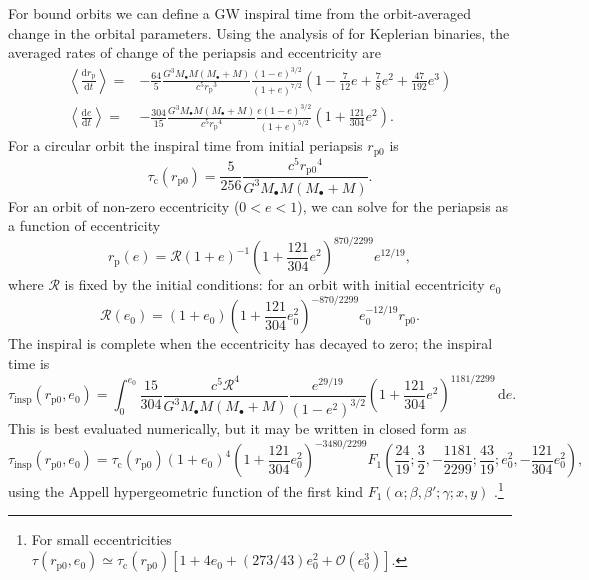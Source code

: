 \documentclass[useAMS,usedcolumn,usegraphicx,usenatbib]{mn2e}
\newcommand{\sub}[1]{\ensuremath{_\mathrm{#1}}}
\newcommand{\dd}{\ensuremath{\mathrm{d}}}
\newcommand{\diff}[2]{\ensuremath{\frac{\dd {#1}}{\dd {#2}}}}
\newcommand{\intd}[4]{\ensuremath{\displaystyle \int_{#1}^{#2}{#3}\,\dd{#4}}}
\newcommand{\order}[1]{\ensuremath{\mathcal{O}({#1})}}
\begin{document}
\begin{onecolumn}
For bound orbits we can define a GW inspiral time from the orbit-averaged change in the orbital parameters. Using the analysis of \citet{Peters1964} for Keplerian binaries, the averaged rates of change of the periapsis and eccentricity are
\begin{align}
\left\langle\diff{r\sub{p}}{t}\right\rangle = {} & -\frac{64}{5}\frac{G^3M_\bullet M(M_\bullet + M)}{c^5r\sub{p}^3}\frac{(1 - e)^{3/2}}{(1 + e)^{7/2}}\left(1 - \frac{7}{12}e + \frac{7}{8}e^2 + \frac{47}{192}e^3\right) \\
\left\langle\diff{e}{t}\right\rangle = {} & -\frac{304}{15}\frac{G^3M_\bullet M(M_\bullet + M)}{c^5r\sub{p}^4}\frac{e(1 - e)^{3/2}}{(1 + e)^{5/2}}\left(1 + \frac{121}{304}e^2\right).
\end{align}
For a circular orbit the inspiral time from initial periapsis $r\sub{p0}$ is
\begin{equation}
\tau\sub{c}(r\sub{p0}) = \frac{5}{256}\frac{c^5r\sub{p0}^4}{G^3M_\bullet M(M_\bullet + M)}.
\end{equation}
For an orbit of non-zero eccentricity ($0 < e < 1$), we can solve for the periapsis as a function of eccentricity
\begin{equation}
r\sub{p}(e) = \mathcal{R}(1 + e)^{-1}\left(1 + \frac{121}{304}e^2\right)^{870/2299}e^{12/19},
\end{equation}
where $\mathcal{R}$ is fixed by the initial conditions: for an orbit with initial eccentricity $e_0$
\begin{equation}
\mathcal{R}(e_0) = (1 + e_0)\left(1 + \frac{121}{304}e_0^2\right)^{-870/2299}e_0^{-12/19}r\sub{p0}.
\end{equation}
The inspiral is complete when the eccentricity has decayed to zero; the inspiral time is \citep{Peters1964}
\begin{equation}
\tau\sub{insp}(r\sub{p0},e_0) = \intd{0}{e_0}{\frac{15}{304}\frac{c^5\mathcal{R}^4}{G^3M_\bullet M(M_\bullet + M)}\frac{e^{29/19}}{(1-e^2)^{3/2}}\left(1 + \frac{121}{304}e^2\right)^{1181/2299}}{e}.
\end{equation}
This is best evaluated numerically, but it may be written in closed form as
\begin{equation}
\tau\sub{insp}(r\sub{p0},e_0) = \tau\sub{c}(r\sub{p0})(1 + e_0)^4\left(1 + \frac{121}{304}e_0^2\right)^{-3480/2299} F_1\left(\frac{24}{19};\frac{3}{2},-\frac{1181}{2299};\frac{43}{19};e_0^2,-\frac{121}{304}e_0^2\right),
\label{eq:Bound_inspiral}
\end{equation}
using the Appell hypergeometric function of the first kind $F_1(\alpha;\beta,\beta';\gamma;x,y)$ \citep[16.15.1]{Olver2010}.\footnote{For small eccentricities $\tau(r\sub{p0},e_0) \simeq \tau\sub{c}(r\sub{p0})[1 + 4e_0 + (273/43)e_0^2 + \order{e_0^3}]$.}


\end{onecolumn}
\end{document}
